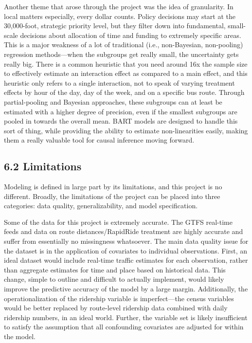 \documentclass[
  12pt,
]{article}
\begin{document}
Another theme that arose through the project was the idea of
granularity. In local matters especially, every dollar counts. Policy
decisions may start at the 30,000-foot, strategic priority level, but
they filter down into fundamental, small-scale decisions about
allocation of time and funding to extremely specific areas. This is a
major weakness of a lot of traditional (i.e., non-Bayesian, non-pooling)
regression methods---when the subgroups get really small, the
uncertainty gets really big. There is a common heuristic that you need
around 16x the sample size to effectively estimate an interaction effect
as compared to a main effect, and this heuristic only refers to a single
interaction, not to speak of varying treatment effects by hour of the
day, day of the week, and on a specific bus route. Through
partial-pooling and Bayesian approaches, these subgroups can at least be
estimated with a higher degree of precision, even if the smallest
subgroups are pooled in towards the overall mean. BART models are
designed to handle this sort of thing, while providing the ability to
estimate non-linearities easily, making them a really valuable tool for
causal inference moving forward.

\subsection{6.2 Limitations}\label{limitations}

Modeling is defined in large part by its limitations, and this project
is no different. Broadly, the limitations of the project can be placed
into three categories: data quality, generalizability, and model
specification.

Some of the data for this project is extremely accurate. The GTFS
real-time feeds and data on route distances/RapidRide treatment are
highly accurate and suffer from essentially no missingness whatsoever.
The main data quality issue for the dataset is in the application of
covariates to individual observations. First, an ideal dataset would
include real-time traffic estimates for each observation, rather than
aggregate estimates for time and place based on historical data. This
change, simple to outline and difficult to actually implement, would
likely improve the predictive accuracy of the model by a large margin.
Additionally, the operationalization of the ridership variable is
imperfect---the census variables would be better replaced by route-level
ridership data combined with daily ridership numbers, in an ideal world.
Further, the variable set is likely insufficient to satisfy the
assumption that all confounding covariates are adjusted for within the
model.
\end{document}
